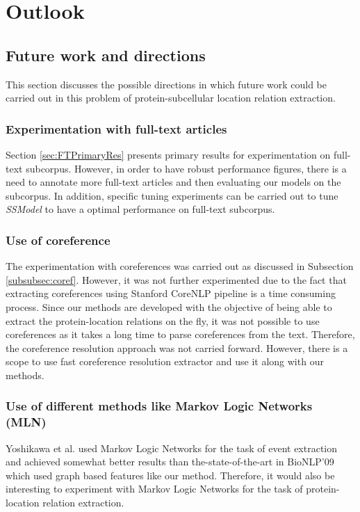 \chapter{Outlook}\label{chapter:outlook}

\section{Future work and directions}

This section discusses the possible directions in which future work could be carried out in this problem of protein-subcellular location relation extraction.

\subsection{Experimentation with full-text articles}

Section \ref{sec:FTPrimaryRes} presents primary results for experimentation on full-text subcorpus. However, in order to have robust performance figures, there is a need to annotate more full-text articles and then evaluating our models on the subcorpus. In addition, specific tuning experiments can be carried out to tune \textit{SSModel} to have a optimal performance on full-text subcorpus.

\subsection{Use of coreference}

The experimentation with coreferences was carried out as discussed in Subsection \ref{subsubsec:coref}. However, it was not further experimented due to the fact that extracting coreferences using Stanford CoreNLP pipeline \cite{manning2014stanford} is a time consuming process. Since our methods are developed with the objective of being able to extract the protein-location relations on the fly, it was not possible to use coreferences as it takes a long time to parse coreferences from the text. Therefore, the coreference resolution approach was not carried forward. However, there is a scope to use fast coreference resolution extractor and use it along with our methods.

\subsection{Use of different methods like Markov Logic Networks (MLN)}


Yoshikawa et al. used Markov Logic Networks \cite{yoshikawa2011coreference} for the task of event extraction and achieved somewhat better results than the-state-of-the-art in BioNLP'09 which used graph based features like our method. Therefore, it would also be interesting to experiment with Markov Logic Networks for the task of protein-location relation extraction.